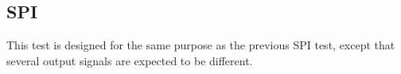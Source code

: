 \subsection{SPI}
This test is designed for the same purpose as the previous SPI test, except that several output signals are expected to be different.
\begin{lstlisting}[style=json, caption={Failing functionality test for the SPI design in appendix \ref{appendix:spi}}, label={json:spi_failing}]
\end{lstlisting}
